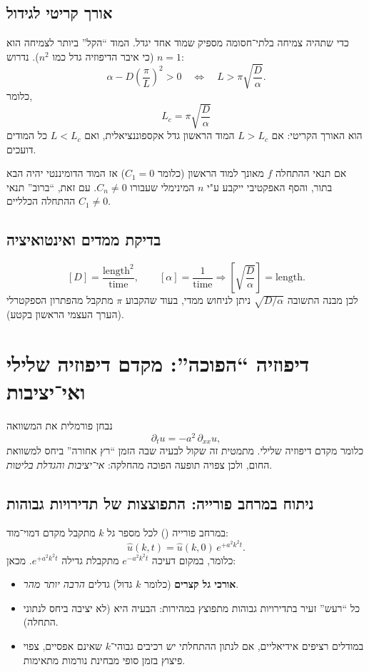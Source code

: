 \subsection{אורך קריטי לגידול}
כדי שתהיה צמיחה בלתי־חסומה מספיק שמוד אחד יגדל.
המוד ``הקל'' ביותר לצמיחה הוא \(n=1\) (כי איבר הדיפוזיה גדל כמו \(n^2\)).
נדרוש:
\[
\alpha-D\left(\frac{\pi}{L}\right)^2>0
\quad\Longleftrightarrow\quad
L>\pi\sqrt{\frac{D}{\alpha}}.
\]
כלומר,
\[
\boxed{
L_c=\pi\sqrt{\frac{D}{\alpha}}
}
\]
הוא האורך הקריטי: אם \(L>L_c\) המוד הראשון גדל אקספוננציאלית, ואם \(L<L_c\) כל המודים דועכים.

\begin{notebox}
אם תנאי ההתחלה \(f\) מאונך למוד הראשון (כלומר \(C_1=0\)) אז המוד הדומיננטי יהיה הבא בתור,
והסף האפקטיבי ייקבע ע"י \(n\) המינימלי שעבורו \(C_n\neq 0\).
עם זאת, ``ברוב'' תנאי ההתחלה הכלליים \(C_1\neq 0\).
\end{notebox}

\subsection{בדיקת ממדים ואינטואיציה}
\[
[D]=\frac{\mathrm{length}^2}{\mathrm{time}},\qquad [\alpha]=\frac{1}{\mathrm{time}}
\Rightarrow
\left[\sqrt{\frac{D}{\alpha}}\right]=\mathrm{length}.
\]
לכן מבנה התשובה \(\sqrt{D/\alpha}\) ניתן לניחוש ממדי, בעוד שהקבוע \(\pi\) מתקבל מהפתרון הספקטרלי (הערך העצמי הראשון בקטע).

\section{דיפוזיה ``הפוכה'': מקדם דיפוזיה שלילי ואי־יציבות}
נבחן פורמלית את המשוואה
\[
\partial_t u = -a^2\,\partial_{xx}u,
\]
כלומר מקדם דיפוזיה שלילי.
מתמטית זה שקול לבעיה שבה הזמן ``רץ אחורה'' ביחס למשוואת החום, ולכן צפויה תופעה הפוכה מהחלקה: \emph{אי־יציבות והגדלת בליטות}.

\subsection{ניתוח במרחב פורייה: התפוצצות של תדירויות גבוהות}
במרחב פורייה () לכל מספר גל \(k\) מתקבל מקדם דמוי־מוד:
\[
\widehat{u}(k,t)=\widehat{u}(k,0)\,e^{+a^2 k^2 t}.
\]
כלומר, במקום דעיכה \(e^{-a^2k^2t}\) מתקבלת גדילה \(e^{+a^2k^2t}\).
מכאן:
\begin{itemize}
\item \textbf{אורכי גל קצרים} (כלומר \(k\) גדול) גדלים \emph{הרבה יותר מהר}.
\item כל ``רעש'' זעיר בתדירויות גבוהות מתפוצץ במהירות: הבעיה היא  (לא יציבה ביחס לנתוני התחלה).
\item במודלים רציפים אידיאליים, אם לנתון ההתחלתי יש רכיבים גבוהי־\(k\) שאינם אפסיים, צפוי פיצוץ בזמן סופי מבחינת נורמות מתאימות.
\end{itemize}

